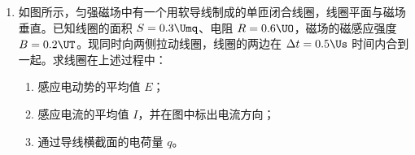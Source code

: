 \documentclass[\gkver]{gaokaozhenti}
\begin{document}
\begin{enumerate}
{（2）在小水滴表面层中，相邻水分子之间的距离大于平衡距离 $r_{0}$，相互作用总体上表现为引力；图中 $E_{p}$ 最小的位置 B 点是 $r_{0}$ 处，所以能总体上反映小水滴表面层中水分子 $E_{p}$ 的是题图 1 中 C 的位置。

（3）$A\rightarrow B$ 过程气体所做的功为 $W_{1} = -p(V_{B} - V_{A})$，$B\rightarrow C$ 过程，由热力学第一定律得 $W_{2} = \Delta U$，则气体对外界做的总功为 $W = -(W_{1} + W_{2})$，代入数据得 $W = 1500\UJ$。

\textbf{B．}（1）在偏角增大的过程中，摆球的位移增大，摆球速度减小，回复力 $F = -kx$ 增大，小球的机械能守恒，故 AC 正确，BD 错误。

（2）通过一条狭缝观察到彩色条纹，这是光的衍射现象；缝的宽度越接近光波的波长，衍射现象越明显。

（3）水平方向光线刚好不从 AB 射出时，$\theta$ 角最大，即入射光刚好发生全反射，有 $\sin C = \frac{1}{n}$，且 $C + \theta = 90^{\circ}$，代入数据解得 $\theta = 60^{\circ}$。
}

\item
如图所示，匀强磁场中有一个用软导线制成的单匝闭合线圈，线圈平面与磁场垂直。已知线圈的面积 $S = 0.3\Umq$、电阻 $R = 0.6\UO$，磁场的磁感应强度 $B = 0.2\UT$。现同时向两侧拉动线圈，线圈的两边在 $\Delta t = 0.5\Us$ 时间内合到一起。求线圈在上述过程中：
\begin{enumerate}
	\item
	感应电动势的平均值 $E$；
	\item
	感应电流的平均值 $I$，并在图中标出电流方向；
	\item
	通过导线横截面的电荷量 $q$。
\end{enumerate}
\end{enumerate}
\end{document}
